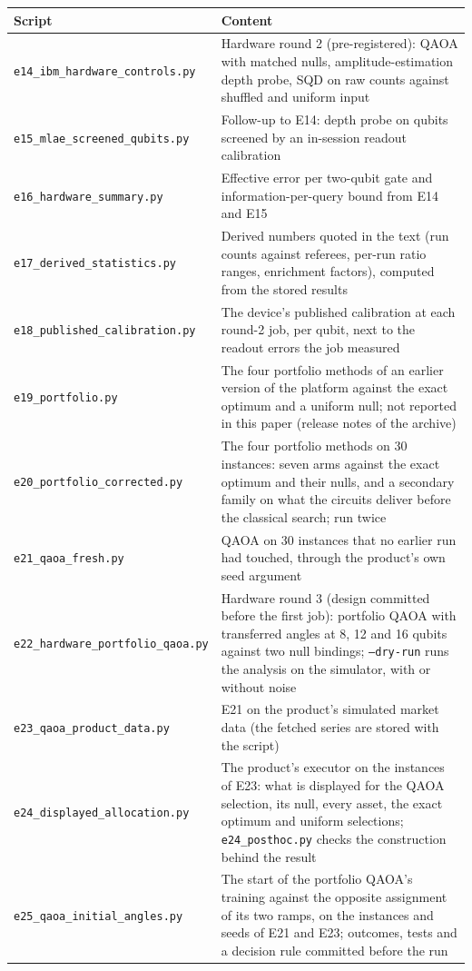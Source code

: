 \documentclass[11pt,a4paper]{article}
\begin{document}
\begin{center}\small\setlength{\tabcolsep}{3pt}
\begin{tabular}{lp{8.95cm}}
\toprule
Script & Content \\
\midrule
\texttt{e14\_ibm\_hardware\_controls.py} & Hardware round 2 (pre-registered): QAOA with matched nulls, amplitude-estimation depth probe, SQD on raw counts against shuffled and uniform input \\
\texttt{e15\_mlae\_screened\_qubits.py} & Follow-up to E14: depth probe on qubits screened by an in-session readout calibration \\
\texttt{e16\_hardware\_summary.py} & Effective error per two-qubit gate and information-per-query bound from E14 and E15 \\
\texttt{e17\_derived\_statistics.py} & Derived numbers quoted in the text (run counts against referees, per-run ratio ranges, enrichment factors), computed from the stored results \\
\texttt{e18\_published\_calibration.py} & The device's published calibration at each round-2 job, per qubit, next to the readout errors the job measured \\
\texttt{e19\_portfolio.py} & The four portfolio methods of an earlier version of the platform against the exact optimum and a uniform null; not reported in this paper (release notes of the archive) \\
\texttt{e20\_portfolio\_corrected.py} & The four portfolio methods on 30 instances: seven arms against the exact optimum and their nulls, and a secondary family on what the circuits deliver before the classical search; run twice \\
\texttt{e21\_qaoa\_fresh.py} & QAOA on 30 instances that no earlier run had touched, through the product's own seed argument \\
\texttt{e22\_hardware\_portfolio\_qaoa.py} & Hardware round 3 (design committed before the first job): portfolio QAOA with transferred angles at 8, 12 and 16 qubits against two null bindings; \texttt{--dry-run} runs the analysis on the simulator, with or without noise \\
\texttt{e23\_qaoa\_product\_data.py} & E21 on the product's simulated market data (the fetched series are stored with the script) \\
\texttt{e24\_displayed\_allocation.py} & The product's executor on the instances of E23: what is displayed for the QAOA selection, its null, every asset, the exact optimum and uniform selections; \texttt{e24\_posthoc.py} checks the construction behind the result \\
\texttt{e25\_qaoa\_initial\_angles.py} & The start of the portfolio QAOA's training against the opposite assignment of its two ramps, on the instances and seeds of E21 and E23; outcomes, tests and a decision rule committed before the run \\
\bottomrule
\end{tabular}
\end{center}
\end{document}
